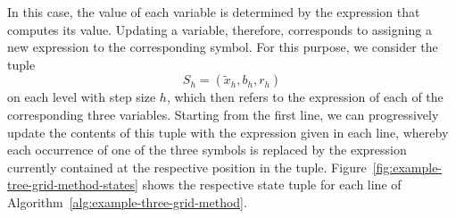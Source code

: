 In this case, the value of each variable is determined by the expression that computes its value.
Updating a variable, therefore, corresponds to assigning a new expression to the corresponding symbol.
For this purpose, we consider the tuple
\begin{equation*}
	S_h = (\tilde{x}_h, b_h, r_h)
\end{equation*} 
on each level with step size $h$, which then refers to the expression of each of the corresponding three variables.
Starting from the first line, we can progressively update the contents of this tuple with the expression given in each line, whereby each occurrence of one of the three symbols is replaced by the expression currently contained at the respective position in the tuple.
Figure~\ref{fig:example-tree-grid-method-states} shows the respective state tuple for each line of Algorithm~\ref{alg:example-three-grid-method}.
